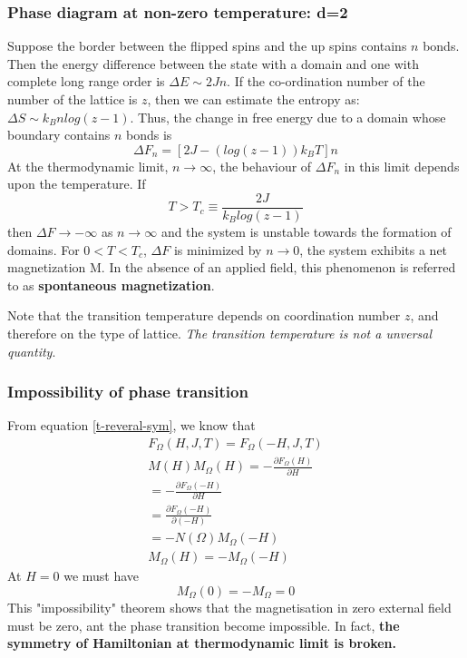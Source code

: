 \documentclass[12pt,titlepage]{article}
\numberwithin{equation}{section}
\begin{document}
\subsubsection{Phase diagram at non-zero temperature: d=2}
Suppose the border between the flipped spins and the up spins contains $n$ bonds. Then the energy difference between the state with a domain and one with complete long range order is $\Delta E\sim 2Jn$. If the co-ordination number of the number of the lattice is $z$, then we can estimate the entropy as:$\Delta S\sim k_Bnlog(z-1)$. Thus, the change in free energy due to a domain whose boundary contains $n$ bonds is
\begin{equation}
    \Delta F_n=[2J-(log(z-1))k_BT]n
\end{equation}
At the thermodynamic limit, $n\rightarrow\infty$, the behaviour of $\Delta F_n$ in this limit depends upon the temperature. If
\begin{equation}
    T>T_c\equiv\frac{2J}{k_Blog(z-1)}
\end{equation}
then $\Delta F\rightarrow-\infty$ as $n\rightarrow\infty$ and the system is unstable towards the formation of domains. For $0<T<T_c$, $\Delta F$ is minimized by $n\rightarrow0$, the system exhibits a net magnetization M. In the absence of an applied field, this phenomenon is referred to as \textbf{spontaneous magnetization}.

Note that the transition temperature depends on coordination number $z$, and therefore on the type of lattice. \emph{The transition temperature is not a unversal quantity}.

\subsubsection{Impossibility of phase transition}
From equation \ref{t-reveral-sym}, we know that 
\begin{equation}
    \begin{array}{l}{ F _ { \Omega } ( H , J , T ) = F _ { \Omega } ( - H , J , T ) }\\{ M ( H ) M _ { \Omega } ( H ) = - \frac { \partial F _ { \Omega } ( H ) } { \partial H } }\\{ = - \frac { \partial F _ { \Omega } ( - H ) } { \partial H } }\\{ = \frac { \partial F _ { \Omega } ( - H ) } { \partial ( - H ) } }\\{ = - N ( \Omega ) M _ { \Omega } ( - H ) }\\{ M _ { \Omega } ( H ) = - M _ { \Omega } ( - H ) }\end{array} 
\end{equation}
At $H=0$ we must have
\begin{equation}
\label{impossible-theorem}
    M_{\Omega}(0) = -M_{\Omega}=0
\end{equation}
This "impossibility" theorem shows that the magnetisation in zero external field must be zero, ant the phase transition become impossible. In fact, \textbf{the symmetry of Hamiltonian at thermodynamic limit is broken.}
\end{document}
